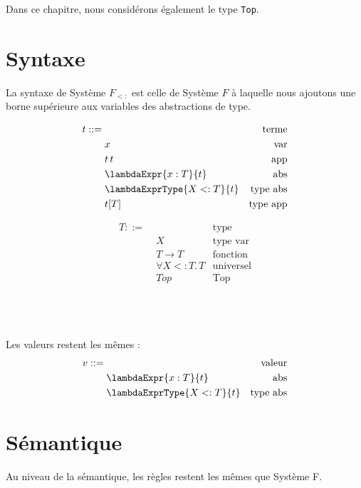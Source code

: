 Dans ce chapitre, nous considérons également le type \verb|Top|.

\section{Syntaxe}

La syntaxe de Système $F_{<:}$ est celle de Système $F$ à laquelle nous ajoutons
une borne supérieure aux variables des abstractions de type.

\begin{minipage}{0.45\textwidth}
  \begin{align*}
    t ::= & \, & \text{terme} \\
          & \; x & \text{var} \\
          & \; t \, t & \text{app} \\
          & \; \lambdaExpr{x : T}{t} & \text{abs} \\
          & \; \lambdaExprType{X <: T}{t} & \text{type abs} \\
          & \; t[T] & \text{type app}
  \end{align*}
\end{minipage}
\begin{minipage}{0.45\textwidth}
  \begin{align*}
    T ::= & \, & \text{type} \\
          & \; X & \text{type var} \\
          & \; T \rightarrow T & \text{fonction} \\
          & \; \forall X <: T. \, T & \text{universel} \\
          & \; Top & \text{Top}
  \end{align*}
\end{minipage}
\\
\\
\\
Les valeurs restent les mêmes :
\begin{align*}
  v ::= & \, & \text{valeur} \\
        & \; \lambdaExpr{x : T}{t} & \text{abs} \\
        & \; \lambdaExprType{X <: T}{t} & \text{type abs}
\end{align*}

\section{Sémantique}

Au niveau de la sémantique, les règles restent les mêmes que Système F.

